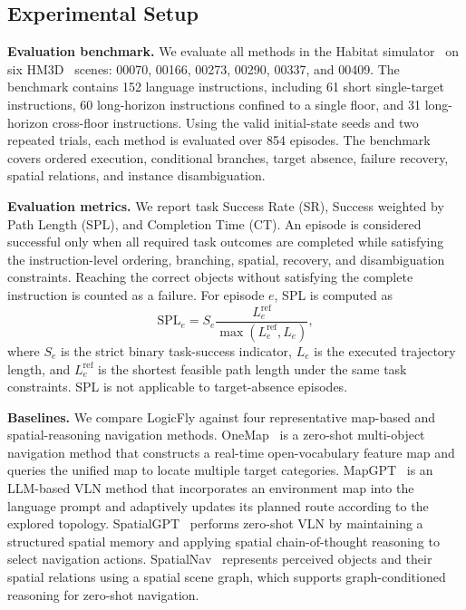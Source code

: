 \documentclass[letterpaper,10pt,journal]{IEEEtran}
\begin{document}
\subsection{Experimental Setup}
\textbf{Evaluation benchmark.}
We evaluate all methods in the Habitat simulator~\cite{savva2019habitat} on six HM3D~\cite{ramakrishnan2021hm3d} scenes: 00070, 00166, 00273, 00290, 00337, and 00409. The benchmark contains 152 language instructions, including 61 short single-target instructions, 60 long-horizon instructions confined to a single floor, and 31 long-horizon cross-floor instructions. Using the valid initial-state seeds and two repeated trials, each method is evaluated over 854 episodes. The benchmark covers ordered execution, conditional branches, target absence, failure recovery, spatial relations, and instance disambiguation.

\textbf{Evaluation metrics.}
We report task Success Rate (SR), Success weighted by Path Length (SPL), and Completion Time (CT). An episode is considered successful only when all required task outcomes are completed while satisfying the instruction-level ordering, branching, spatial, recovery, and disambiguation constraints. Reaching the correct objects without satisfying the complete instruction is counted as a failure. For episode $e$, SPL is computed as
\begin{equation}
\mathrm{SPL}_e=S_e\frac{L_e^{\mathrm{ref}}}
{\max(L_e^{\mathrm{ref}},L_e)},
\end{equation}
where $S_e$ is the strict binary task-success indicator, $L_e$ is the executed trajectory length, and $L_e^{\mathrm{ref}}$ is the shortest feasible path length under the same task constraints. SPL is not applicable to target-absence episodes.

\textbf{Baselines.}
We compare LogicFly against four representative map-based and spatial-reasoning navigation methods. OneMap~\cite{busch2025onemap} is a zero-shot multi-object navigation method that constructs a real-time open-vocabulary feature map and queries the unified map to locate multiple target categories. MapGPT~\cite{chen2024mapgpt} is an LLM-based VLN method that incorporates an environment map into the language prompt and adaptively updates its planned route according to the explored topology. SpatialGPT~\cite{jiang2025spatialgpt} performs zero-shot VLN by maintaining a structured spatial memory and applying spatial chain-of-thought reasoning to select navigation actions. SpatialNav~\cite{zhang2026spatialnav} represents perceived objects and their spatial relations using a spatial scene graph, which supports graph-conditioned reasoning for zero-shot navigation.
\end{document}
